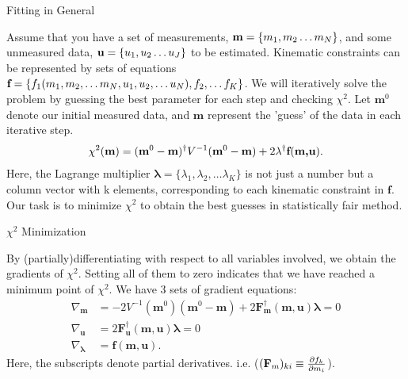 \documentclass[
	xcolor=dvipsnames,
	10pt, 
	]{beamer}
\begin{document}
\begin{frame}{Fitting in General}
	\begin{block}{}
		Assume that you have a set of measurements, $\textbf m =\{m_1,m_2\ldots m_N\}$, and some unmeasured data, $\textbf u =\{u_1,u_2\ldots u_J\}$ to be estimated. Kinematic constraints can be represented by sets of equations $\textbf f =\{f_1(m_1,m_2,\ldots m_N,u_1,u_2,\ldots u_N),f_2,\ldots f_K\}$. We will iteratively solve the problem by guessing the best parameter for each step and checking  $\chi^2$.  Let $\mathbf m^0$ denote our initial measured data, and $\mathbf m$ represent the 'guess' of the data in each iterative step.
		\vspace{-2 mm}
		\begin{align}
			\chi^2(\textbf{m}) = (\textbf{m}^0-\textbf{m})^\dagger V^{-1}(\textbf{m}^0-\textbf{m})+2\mathbf\lambda^\dagger \textbf f(\textbf{m,u}).\label{KFChi2}
		\end{align}
		Here, the Lagrange multiplier $\mathbf \lambda =\{\lambda_1,\lambda_2,\ldots\lambda_K\}$ is not just a number but a column vector with k elements, corresponding to each kinematic constraint in $\mathbf f$. Our task is to minimize $\chi^2$ to obtain the best guesses in statistically fair method.	
	\end{block}
\end{frame}
\begin{frame}{$\chi^2$ Minimization}
	\begin{block}{}
		By (partially)differentiating with respect to all variables involved, we obtain the gradients of $\chi^2$. Setting all of them to zero indicates that we have reached a minimum point of $\chi^2$. We have 3 sets of gradient equations:
		\begin{align}
			\nabla_{\mathbf m} &= -2 V^{-1}(\mathbf m^0)(\mathbf m^0-\mathbf m) + 2 \mathbf F_\mathbf m^\dagger(\mathbf{m,u})\mathbf\lambda=0\label{GradM}\\
			\nabla_{\mathbf u} &= 2\mathbf F_\mathbf u^\dagger(\mathbf{m,u})\mathbf \lambda =0\label{GradU}\\
			\nabla_{\mathbf \lambda}& = \mathbf f(\mathbf{m,u})\label{GradL}.
		\end{align}
		Here, the subscripts denote partial derivatives. i.e. ($(\mathbf {F}_m)_{ki}\equiv\frac{\partial f_k}{\partial m_i}$).
	\end{block}
\end{frame}
\end{document}
